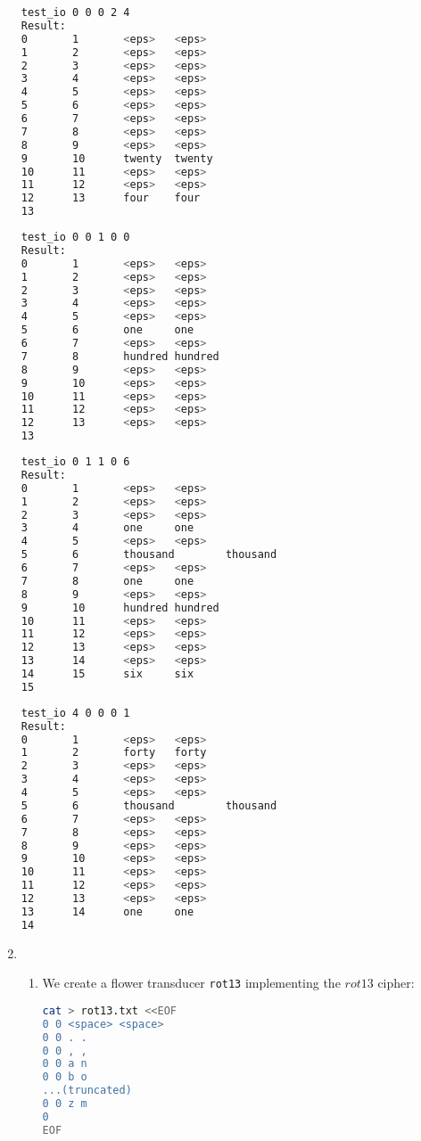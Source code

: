 \documentclass[a4paper,oneside,reqno]{amsart}
\begin{document}
\begin{enumerate}[label=\arabic*.]
    \begin{lstlisting}[language=bash]
test_io 0 0 0 2 4
Result:
0       1       <eps>   <eps>
1       2       <eps>   <eps>
2       3       <eps>   <eps>
3       4       <eps>   <eps>
4       5       <eps>   <eps>
5       6       <eps>   <eps>
6       7       <eps>   <eps>
7       8       <eps>   <eps>
8       9       <eps>   <eps>
9       10      twenty  twenty
10      11      <eps>   <eps>
11      12      <eps>   <eps>
12      13      four    four
13
    \end{lstlisting}
    \begin{lstlisting}[language=bash]
test_io 0 0 1 0 0
Result:
0       1       <eps>   <eps>
1       2       <eps>   <eps>
2       3       <eps>   <eps>
3       4       <eps>   <eps>
4       5       <eps>   <eps>
5       6       one     one
6       7       <eps>   <eps>
7       8       hundred hundred
8       9       <eps>   <eps>
9       10      <eps>   <eps>
10      11      <eps>   <eps>
11      12      <eps>   <eps>
12      13      <eps>   <eps>
13
    \end{lstlisting}
    \begin{lstlisting}[language=bash]
test_io 0 1 1 0 6
Result:
0       1       <eps>   <eps>
1       2       <eps>   <eps>
2       3       <eps>   <eps>
3       4       one     one
4       5       <eps>   <eps>
5       6       thousand        thousand
6       7       <eps>   <eps>
7       8       one     one
8       9       <eps>   <eps>
9       10      hundred hundred
10      11      <eps>   <eps>
11      12      <eps>   <eps>
12      13      <eps>   <eps>
13      14      <eps>   <eps>
14      15      six     six
15
    \end{lstlisting}
    \begin{lstlisting}[language=bash]
test_io 4 0 0 0 1
Result:
0       1       <eps>   <eps>
1       2       forty   forty
2       3       <eps>   <eps>
3       4       <eps>   <eps>
4       5       <eps>   <eps>
5       6       thousand        thousand
6       7       <eps>   <eps>
7       8       <eps>   <eps>
8       9       <eps>   <eps>
9       10      <eps>   <eps>
10      11      <eps>   <eps>
11      12      <eps>   <eps>
12      13      <eps>   <eps>
13      14      one     one
14
    \end{lstlisting}

  \item
    \begin{enumerate}[label=(\alph*)]
      \item We create a flower transducer \texttt{rot13} implementing the $rot13$ cipher:
        \begin{lstlisting}[language=bash]
cat > rot13.txt <<EOF
0 0 <space> <space>
0 0 . .
0 0 , ,
0 0 a n
0 0 b o
...(truncated)
0 0 z m
0
EOF
        \end{lstlisting}


\end{enumerate}
\end{enumerate}
\end{document}
